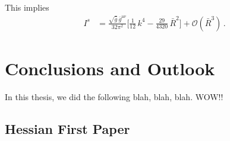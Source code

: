 \documentclass[11pt]{book} %
\numberwithin{equation}{chapter}
\begin{document}
{This implies
\begin{align}
  I^s &= \frac{ \sqrt{\bar g} \, \bar g^{\mu\nu} }{ 32 \pi^2 }
  \bigg[
    \frac{1}{12} \, k^4  - \frac{29}{4320} \, \bar R^2
  \bigg]
  + \mathcal O (\bar R^3) \,.
\end{align}



\chapter*{Conclusions and Outlook}

In this thesis, we did the following blah, blah, blah.
\newpage
WOW!!


\nocite{*}




\appendix
\begin{appendices}
  \chapter{Hessian First Paper}


\end{appendices}}
\end{document}
